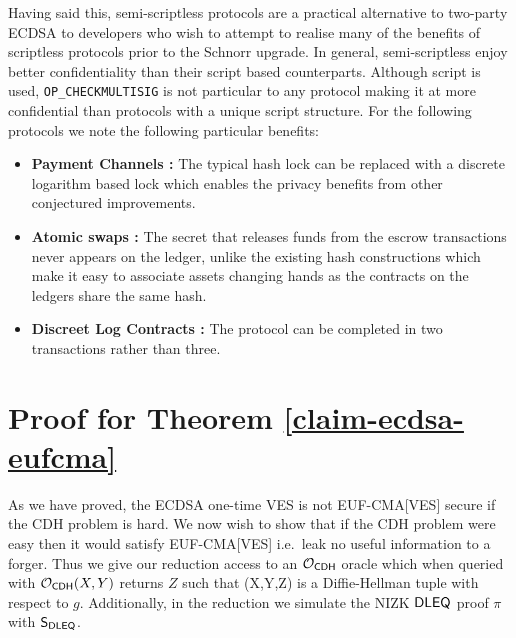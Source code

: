 \documentclass[fullpage]{article}
\theoremstyle{definition}
\newcommand{\EUFCMAVES}{\textsf{EUF-CMA}[\textsf{VES}]\xspace}
\newcommand{\OPCHECKMULTISIG}{\texttt{OP\_CHECKMULTISIG}\xspace}
\begin{document}
Having said this, semi-scriptless protocols are a practical alternative to two-party ECDSA to developers who wish to attempt to realise many of the benefits of scriptless protocols prior to the Schnorr upgrade. In general, semi-scriptless enjoy better confidentiality than their script based counterparts. Although script is used, \OPCHECKMULTISIG is not particular to any protocol making it at more confidential than protocols with a unique script structure. For the following protocols we note the following particular benefits:

\begin{itemize}
    \item \textbf{Payment Channels \cite{poon2016bitcoin}:} The typical hash lock can be replaced with a discrete logarithm based lock which enables the privacy benefits from \cite{cryptoeprint:2018:472} other conjectured improvements\cite{lightning-dev-scriptless-scripts}.
    \item \textbf{Atomic swaps \cite{scriptless-atomic-swap}:} The secret that releases funds from the escrow transactions never appears on the ledger, unlike the existing hash constructions which make it easy to associate assets changing hands as the contracts on the ledgers share the same hash.
    \item \textbf{Discreet Log Contracts \cite{dryja2017discreet}:} The protocol can be completed in two transactions rather than three.
\end{itemize}

\FloatBarrier
{}


\appendix
\section{ Proof for Theorem \ref{claim-ecdsa-eufcma}}

\newcommand{\Ocdh}{\mathcal{O}_{\CDH}}
\newcommand{\betarange}{\mathbb{B}}
\newcommand{\Sdleq}{\pcalgostyle{S}_{\DLEQ}}

\label{proof-ecdsa-eufcma}
As we have proved, the ECDSA one-time VES is not \EUFCMAVES secure if the CDH problem is hard. We now wish to show that if the CDH problem were easy then it would satisfy \EUFCMAVES i.e.\ leak no useful information to a forger. Thus we give our reduction access to an $\Ocdh$ oracle which when queried with $\Ocdh(X,Y)$ returns $Z$ such that (X,Y,Z) is a Diffie-Hellman tuple with respect to $g$. Additionally, in the reduction we simulate the NIZK $\textsf{DLEQ}$ proof $\pi$ with $\Sdleq$.
\end{document}
